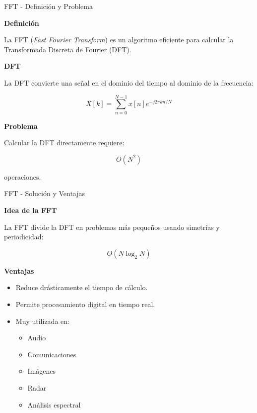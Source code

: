 \documentclass[aspectratio=169]{beamer}
\begin{document}
\begin{frame}{FFT - Definición y Problema}

\textbf{Definición}

La FFT (\textit{Fast Fourier Transform}) es un algoritmo eficiente para calcular la Transformada Discreta de Fourier (DFT).

\vspace{0.4cm}

\textbf{DFT}

La DFT convierte una señal en el dominio del tiempo al dominio de la frecuencia:

\[
X[k] = \sum_{n=0}^{N-1} x[n]e^{-j2\pi kn/N}
\]

\textbf{Problema}

Calcular la DFT directamente requiere:

\[
O(N^2)
\]

operaciones.

\end{frame}


\begin{frame}{FFT - Solución y Ventajas}

\textbf{Idea de la FFT}

La FFT divide la DFT en problemas más pequeños usando simetrías y periodicidad:

\[
O(N\log_2 N)
\]

\vspace{0.4cm}

\textbf{Ventajas}

\begin{itemize}
    \item Reduce drásticamente el tiempo de cálculo.
    \item Permite procesamiento digital en tiempo real.
    \item Muy utilizada en:
    \begin{itemize}
        \item Audio
        \item Comunicaciones
        \item Imágenes
        \item Radar
        \item Análisis espectral
    \end{itemize}
\end{itemize}

\end{frame}
\end{document}
